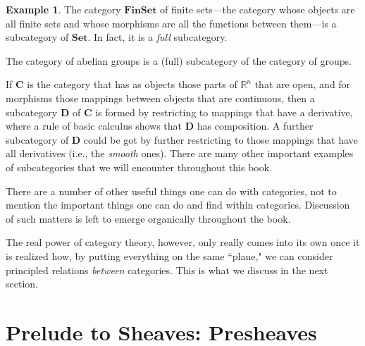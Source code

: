 \documentclass[11pt]{book}
\theoremstyle{definition}
\newtheorem{example}{Example}[section]
\theoremstyle{definition}
\theoremstyle{definition}
\theoremstyle{theorem}
\theoremstyle{definition}
\begin{document}
\begin{example}
	The category $\textbf{FinSet}$ of finite sets---the category whose objects are all finite sets and whose morphisms are all the functions between them---is a subcategory of $\textbf{Set}$. In fact, it is a \textit{full} subcategory. \par 
	The category of abelian groups is a (full) subcategory of the category of groups. \par 
	If $\textbf{C}$ is the category that has as objects those parts of $\mathbb{R}^n$ that are open, and for morphisms those mappings between objects that are continuous, then a subcategory $\textbf{D}$ of $\textbf{C}$ is formed by restricting to mappings that have a derivative, where a rule of basic calculus shows that $\textbf{D}$ has composition. A further subcategory of $\textbf{D}$ could be got by further restricting to those mappings that have all derivatives (i.e., the \textit{smooth} ones). There are many other important examples of subcategories that we will encounter throughout this book. 
\end{example}
There are a number of other useful things one can do with categories, not to mention the important things one can do and find within categories. Discussion of such matters is left to emerge organically throughout the book. \par 
	The real power of category theory, however, only really comes into its own once it is realized how, by putting everything on the same ``plane," we can consider principled relations \textit{between} categories. This is what we discuss in the next section. 
	\section{Prelude to Sheaves: Presheaves} 
\end{document}

